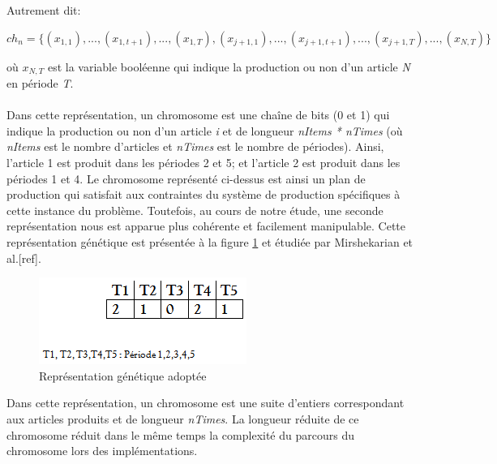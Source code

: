 \documentclass[12pt,a4paper]{article}
\begin{document}
	Autrement dit:
	\begin{center}
		$ch_{n} = \{(x_{1,1}),..., (x_{1,t+1}),..., ( x_{1,T}), (x_{j+1,1}),...,(x_{j+1, t+1}),..., (x_{j+1,T}),..., (x_{N,T})\}$ \\
	\end{center}
	\hspace*{.5cm} où $x_{N,T}$ est la variable booléenne qui indique la production ou non d'un article \emph{N} en période \emph{T}.  \\
	\\
	\hspace*{.5cm} Dans cette représentation, un chromosome est une chaîne de bits (0 et 1) qui indique la production ou non d'un article \emph{i} et de longueur \emph{nItems * nTimes} (où \emph{nItems} est le nombre d'articles et \emph{nTimes} est le nombre de périodes). Ainsi, l'article 1 est produit dans les périodes 2 et 5; et l'article 2 est produit dans les périodes 1 et 4. Le chromosome représenté ci-dessus est ainsi un plan de production qui satisfait aux contraintes du système de production spécifiques à cette instance du problème. Toutefois, au cours de notre étude, une seconde représentation nous est apparue plus cohérente et facilement manipulable. Cette représentation génétique est présentée à la figure \ref{fig:adopt_gene_repr} et étudiée par Mirshekarian et al.[ref].
	
	\begin{figure}[!h]
		\begin{center}
			\includegraphics[scale=.5]{img/adopt_gene_repr.png}
			\caption{Représentation génétique adoptée}
			\label{fig:adopt_gene_repr}
		\end{center}
	\end{figure}
	
	Dans cette représentation, un chromosome est une suite d'entiers correspondant aux articles produits et de longueur \emph{nTimes}. La longueur réduite de ce chromosome réduit dans le même temps la complexité du parcours du chromosome lors des implémentations.
\end{document}
